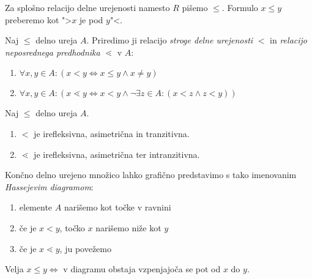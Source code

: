 \documentclass[12pt, a4paper]{article}
\renewcommand{\iff}{\Leftrightarrow}
\begin{document}
Za splošno relacijo delne urejenosti namesto $R$ pišemo $\leq$. Formulo $x\leq y$ preberemo kot ">$x$ je pod $y$"<.

\begin{definicija}
Naj $\leq$ delno ureja $A$. Priredimo ji relacijo \emph{stroge delne urejenosti} $<$ in \emph{relacijo neposrednega predhodnika} $\lessdot$ v $A$:

\begin{enumerate}
\item $\forall x,y\in A\colon (x<y\iff x\leq y\land x\ne y)$
\item $\forall x,y\in A\colon (x\lessdot y\iff x<y\land \neg\exists z\in A\colon(x<z\land z<y))$
\end{enumerate}
\end{definicija}

\begin{trditev}
Naj $\leq$ delno ureja $A$.

\begin{enumerate}
\item $<$ je irefleksivna, asimetrična in tranzitivna.
\item $\lessdot$ je irefleksivna, asimetrična ter intranzitivna.
\end{enumerate}
\end{trditev}

Končno delno urejeno množico lahko grafično predstavimo s tako imenovanim \emph{Hassejevim diagramom}:

\begin{enumerate}
\item elemente $A$ narišemo kot točke v ravnini
\item če je $x<y$, točko $x$ narišemo niže kot $y$
\item če je $x\lessdot y$, ju povežemo
\end{enumerate}

Velja $x\leq y\iff$ v diagramu obstaja vzpenjajoča se pot od $x$ do $y$.
\end{document}
